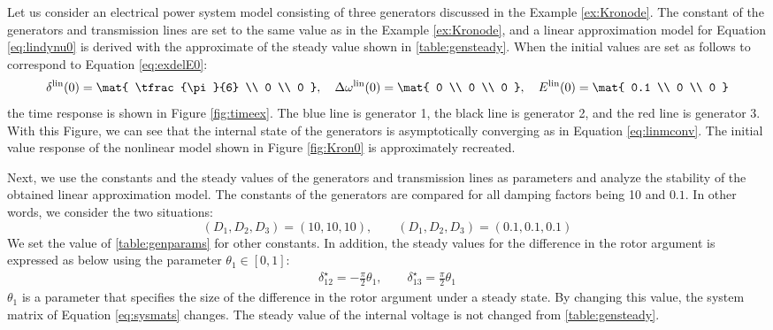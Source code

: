 \documentclass[graybox, envcountchap]{svmult}
\begin{document}



\begin{example}\label{ex:linsyssim}
Let us consider an electrical power system model consisting of three generators discussed in the Example \ref{ex:Kronode}.
The constant of the generators and transmission lines are set to the same value as in the Example \ref{ex:Kronode}, and a linear approximation model for Equation \ref{eq:lindynu0} is derived with the approximate of the steady value shown in \ref{table:gensteady}.
When the initial values are set as follows to correspond to Equation \ref{eq:exdelE0}:
\begin{align}\label{eq:linmini}
\delta^{\rm lin}(0)
 =
\mat{
\tfrac{\pi}{6} \\
0 \\
0
},\quad
\Delta \omega^{\rm lin}(0)
 =
\mat{
0 \\
0 \\
0
},\quad
E^{\rm lin}(0)
 =
\mat{
0.1 \\
0 \\
0
}
\end{align}
the time response is shown in Figure \ref{fig:timeex}. The blue line is generator 1,
the black line is generator 2, and the red line is generator 3. With this
Figure, we can see that the internal state of the generators is asymptotically
converging as in Equation \ref{eq:linmconv}. The initial value response of the
nonlinear model shown in Figure \ref{fig:Kron0} is approximately recreated. 

Next, we use the constants and the steady values of the generators and
transmission lines as parameters and analyze the stability of the obtained
linear approximation model. The constants of the generators are compared for all
damping factors being 10 and $0.1$. In other words, we consider the two
situations:
\[
(D_1,D_2,D_3)= (10,10,10), \qquad
(D_1,D_2,D_3)= \left(0.1,0.1,0.1\right)
\]
We set the value of \ref{table:genparams} for other constants. In addition, the
steady values for the difference in the rotor argument is expressed as below
using the parameter $\theta_1 \in [0, 1]$:
\begin{align}
\delta_{12}^{\star}= - \frac{\pi}{2} \theta_1
,\qquad
\delta_{13}^{\star}=  \frac{\pi}{2} \theta_1
\end{align}
$\theta_1$ is a parameter that specifies the size of the difference in the rotor argument under a steady state.
By changing this value, the system matrix of Equation \ref{eq:sysmats} changes.
The steady value of the internal voltage is not changed from \ref{table:gensteady}.


\end{example}
\end{document}
